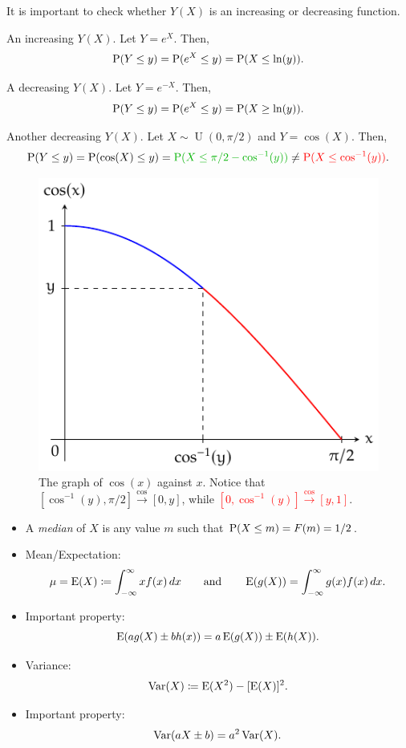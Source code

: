 \begin{note}
  It is important to check whether \(Y(X)\) is an increasing or decreasing function.
\end{note}
\begin{example}{An increasing \(Y(X)\).}{}
  Let \(Y=e^X\). Then,
  \[\operatorname{P}(Y\leq y)=\operatorname{P}(e^X\leq y)=\operatorname{P}(X\leq\ln(y)).\]
\end{example}
\begin{example}{A decreasing \(Y(X)\).}{}
  Let \(Y=e^{-X}\). Then,
  \[\operatorname{P}(Y\leq y)=\operatorname{P}(e^X\leq y)=\operatorname{P}(X\geq\ln(y)).\]
\end{example}
\begin{example}{Another decreasing \(Y(X)\).}
  Let \(X\sim\operatorname{U}(0,\pi/2)\) and \(Y=\cos(X)\). Then, 
  \[\Prob(Y\leq y)=\Prob(\cos(X)\leq y)=\textcolor{green!70!black}{\Prob(X\leq\pi/2-\cos^{-1}(y))}\neq \textcolor{red}{\Prob(X\leq\cos^{-1}(y))}.\]
  \begin{figure}[H]
    \centering
    \includegraphics{Diagrams/CRV-cosine/diagram.pdf}
    \caption{The graph of \(\cos(x)\) against \(x\). Notice that \textcolor{green!70!black}{\([\cos^{-1}(y),\pi/2]\stackrel{\cos}{\to}[0,y]\)}, while \textcolor{red}{\([0,\cos^{-1}(y)]\stackrel{\cos}{\to}[y,1]\)}.}
    \label{fig:CRV-cosine}
  \end{figure}
\end{example}
\begin{stbox}{}
  \begin{itemize}
    \item A \emph{median} of \(X\) is any value \(m\) such that \(\operatorname{P}(X\leq m)=F(m)=1/2\).
    \item Mean/Expectation: 
    \[\mu=\operatorname{E}(X)\coloneq \int_{-\infty}^{\infty}xf(x)\,dx \qquad\text{and}\qquad \operatorname{E}(g(X))=\int_{-\infty}^{\infty}g(x)f(x)\,dx.\]
    \item Important property: 
    \[\operatorname{E}(ag(X)\pm bh(x))=a\operatorname{E}(g(X))\pm\operatorname{E}(h(X)).\]
    \item Variance: 
    \[\operatorname{Var}(X)\coloneq \operatorname{E}(X^2)-[\operatorname{E}(X)]^2.\]
    \item Important property:
    \[\operatorname{Var}(aX\pm b)=a^2\operatorname{Var}(X).\]
  \end{itemize}
\end{stbox}